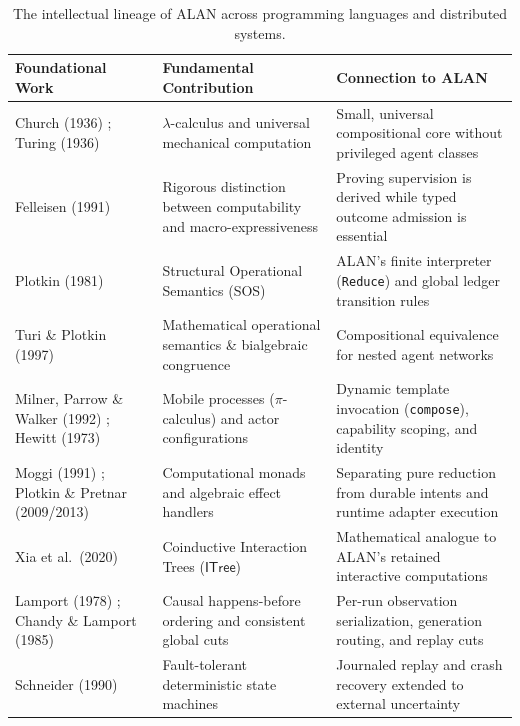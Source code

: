 \documentclass[11pt,a4paper]{article}
\theoremstyle{definition}
\theoremstyle{remark}
\newcommand{\ITree}{\mathsf{ITree}}
\begin{document}
\begin{table}[ht]
\centering
\small
\begin{tabular}{@{}>{\raggedright\arraybackslash}p{}>{\raggedright\arraybackslash}p{}>{\raggedright\arraybackslash}p{}@{}}
\toprule
\textbf{Foundational Work} & \textbf{Fundamental Contribution} & \textbf{Connection to ALAN} \\
\midrule
Church (1936) \cite{church1936unsolvable}; Turing (1936) \cite{turing1936computable} & $\lambda$-calculus and universal mechanical computation & Small, universal compositional core without privileged agent classes \\
Felleisen (1991) \cite{felleisen1991expressive} & Rigorous distinction between computability and macro-expressiveness & Proving supervision is derived while typed outcome admission is essential \\
Plotkin (1981) \cite{plotkin1981structural} & Structural Operational Semantics (SOS) & ALAN's finite interpreter (\texttt{Reduce}) and global ledger transition rules \\
Turi \& Plotkin (1997) \cite{turi1997towards} & Mathematical operational semantics \& bialgebraic congruence & Compositional equivalence for nested agent networks \\
Milner, Parrow \& Walker (1992) \cite{milner1992calculus}; Hewitt (1973) \cite{hewitt1973universal} & Mobile processes ($\pi$-calculus) and actor configurations & Dynamic template invocation (\texttt{compose}), capability scoping, and identity \\
Moggi (1991) \cite{moggi1991notions}; Plotkin \& Pretnar (2009/2013) \cite{plotkin2013handling} & Computational monads and algebraic effect handlers & Separating pure reduction from durable intents and runtime adapter execution \\
Xia et al.\ (2020) \cite{xia2020interaction} & Coinductive Interaction Trees ($\ITree$) & Mathematical analogue to ALAN's retained interactive computations \\
Lamport (1978) \cite{lamport1978time}; Chandy \& Lamport (1985) \cite{chandy1985distributed} & Causal happens-before ordering and consistent global cuts & Per-run observation serialization, generation routing, and replay cuts \\
Schneider (1990) \cite{schneider1990implementing} & Fault-tolerant deterministic state machines & Journaled replay and crash recovery extended to external uncertainty \\
\bottomrule
\end{tabular}
\caption{The intellectual lineage of ALAN across programming languages and distributed systems.}
\label{tab:lineage}
\end{table}
\end{document}
